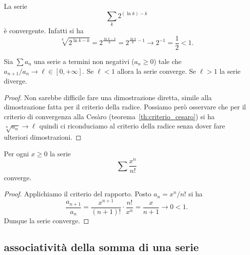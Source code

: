 \begin{example}
La serie
\[
  \sum_k 2^{(\ln k) - k}
\]
è convergente. Infatti si ha
\[
 \sqrt[k]{2^{\ln k - k}}
 = 2^{\frac{\ln k - k}{k}}
 = 2^{\frac{\ln k }k - 1}
 \to 2^{-1}
 = \frac{1}{2}
 < 1.
\]
\end{example}

\begin{theorem}
\mymark{***}
Sia $\sum a_n$ una serie a termini non negativi
($a_n\ge 0$)
tale che $a_{n+1} / a_n \to \ell \in [0,+\infty]$.
Se $\ell <1$ allora la serie converge.
Se $\ell > 1$ la serie diverge.
\end{theorem}
%
\begin{proof}
\mymark{*}
Non sarebbe difficile fare una dimostrazione diretta, simile alla dimostrazione fatta per il criterio della radice.
Possiamo però osservare che
per il criterio di convergenza alla Cesàro (teorema~\ref{th:criterio_cesaro}) si ha $\sqrt[n]{a_n} \to \ell$
quindi ci riconduciamo al criterio della radice senza dover fare ulteriori dimostrazioni.
\end{proof}

\begin{example}
\mymark{***}
Per ogni $x\ge 0$ la serie
\[
  \sum \frac{x^n}{n!}
\]
converge.
\end{example}
%
\begin{proof}
Applichiamo il criterio del rapporto.
Posto $a_n = x^n / n!$ si ha
\[
\frac{a_{n+1}}{a_n}
= \frac{x^{n+1}}{(n+1)!}\cdot \frac{n!}{x^n}
= \frac{x}{n+1} \to 0 < 1.
\]
Dunque la serie converge.
\end{proof}

\subsection{associatività della somma di una serie}

